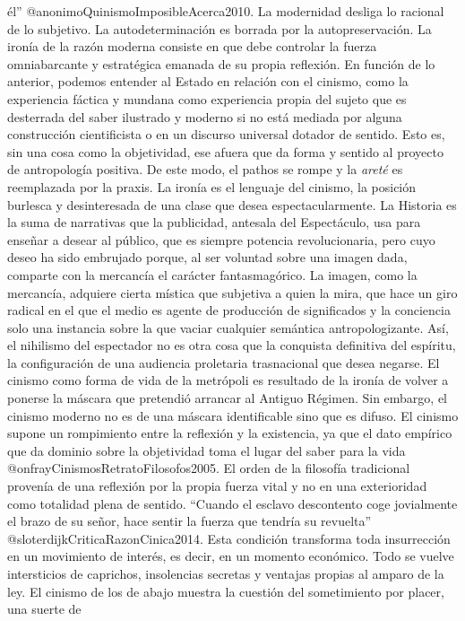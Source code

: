 \documentclass[
]{article}
\begin{document}
él'' @anonimoQuinismoImposibleAcerca2010. La modernidad desliga lo
racional de lo subjetivo. La autodeterminación es borrada por la
autopreservación. La ironía de la razón moderna consiste en que debe
controlar la fuerza omniabarcante y estratégica emanada de su propia
reflexión. En función de lo anterior, podemos entender al Estado en
relación con el cinismo, como la experiencia fáctica y mundana como
experiencia propia del sujeto que es desterrada del saber ilustrado y
moderno si no está mediada por alguna construcción cientificista o en un
discurso universal dotador de sentido. Esto es, sin una cosa como la
objetividad, ese afuera que da forma y sentido al proyecto de
antropología positiva. De este modo, el pathos se rompe y la
\emph{areté} es reemplazada por la praxis. La ironía es el lenguaje del
cinismo, la posición burlesca y desinteresada de una clase que desea
espectacularmente. La Historia es la suma de narrativas que la
publicidad, antesala del Espectáculo, usa para enseñar a desear al
público, que es siempre potencia revolucionaria, pero cuyo deseo ha sido
embrujado porque, al ser voluntad sobre una imagen dada, comparte con la
mercancía el carácter fantasmagórico. La imagen, como la mercancía,
adquiere cierta mística que subjetiva a quien la mira, que hace un giro
radical en el que el medio es agente de producción de significados y la
conciencia solo una instancia sobre la que vaciar cualquier semántica
antropologizante. Así, el nihilismo del espectador no es otra cosa que
la conquista definitiva del espíritu, la configuración de una audiencia
proletaria trasnacional que desea negarse. El cinismo como forma de vida
de la metrópoli es resultado de la ironía de volver a ponerse la máscara
que pretendió arrancar al Antiguo Régimen. Sin embargo, el cinismo
moderno no es de una máscara identificable sino que es difuso. El
cinismo supone un rompimiento entre la reflexión y la existencia, ya que
el dato empírico que da dominio sobre la objetividad toma el lugar del
saber para la vida @onfrayCinismosRetratoFilosofos2005. El orden de la
filosofía tradicional provenía de una reflexión por la propia fuerza
vital y no en una exterioridad como totalidad plena de sentido. ``Cuando
el esclavo descontento coge jovialmente el brazo de su señor, hace
sentir la fuerza que tendría su revuelta''
@sloterdijkCriticaRazonCinica2014. Esta condición transforma toda
insurrección en un movimiento de interés, es decir, en un momento
económico. Todo se vuelve intersticios de caprichos, insolencias
secretas y ventajas propias al amparo de la ley. El cinismo de los de
abajo muestra la cuestión del sometimiento por placer, una suerte de
\end{document}
